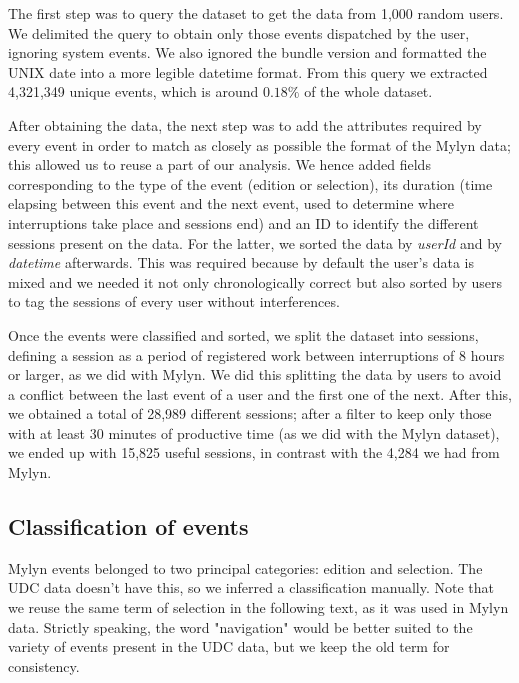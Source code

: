 \documentclass[times]{smrauth}
\begin{document}
The first step was to query the dataset to get the data from 1,000 random users. We delimited the query to obtain only those events dispatched by the user, ignoring system events. We also ignored the bundle version and formatted the UNIX date into a more legible datetime format. From this query we extracted 4,321,349 unique events, which is around $0.18\%$ of the whole dataset.

After obtaining the data, the next step was to add the attributes required by every event in order to match as closely as possible the format of the Mylyn data; this allowed us to reuse a part of our analysis. We hence added fields corresponding to the type of the event (edition or selection), its duration (time elapsing between this event and the next event, used to determine where interruptions take place and sessions end) and an ID to identify the different sessions present on the data. For the latter, we sorted the data by \textit{userId} and by \textit{datetime} afterwards. This was required because by default the user's data is mixed and we needed it not only chronologically correct but also sorted by users to tag the sessions of every user without interferences. 


Once the events were classified and sorted, we split the dataset into sessions, defining a session as a period of registered work between interruptions of 8 hours or larger, as we did with Mylyn. We did this splitting the data by users to avoid a conflict between the last event of a user and the first one of the next. After this, we obtained a total of 28,989 different sessions; after a filter to keep only those with at least 30 minutes of productive time (as we did with the Mylyn dataset), we ended up with 15,825 useful sessions, in contrast with the 4,284 we had from Mylyn.

\subsection{Classification of events}
Mylyn events belonged to two principal categories: edition and selection. The UDC data doesn't have this, so we inferred a classification manually. Note that we reuse the same term of selection in the following text, as it was used in Mylyn data. Strictly speaking, the word "navigation" would be better suited to the variety of events present in the UDC data, but we keep the old term for consistency.
\end{document}
